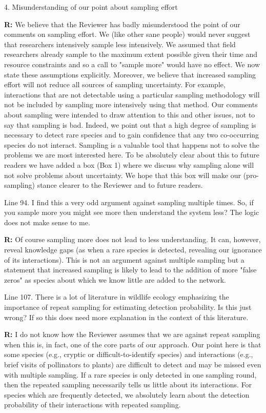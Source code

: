 \documentclass[12pt]{letter}
\begin{document}
4. Misunderstanding of our point about sampling effort



	\textbf{R:} We believe that the Reviewer has badly misunderstood the point of our comments on sampling effort. We (like other sane people) would never suggest that researchers intensively sample less intensively. We assumed that field researchers already sample to the maximum extent possible given their time and resource constraints and so a call to "sample more" would have no effect. We now state these assumptions explicitly. Moreover, we believe that increased sampling effort will not reduce all sources of sampling uncertainty. For example, interactions that are not detectable using a particular sampling methodology will not be included by sampling more intensively using that method. Our comments about sampling were intended to draw attention to this and other issues, not to say that sampling is bad. Indeed, we point out that a high degree of sampling is necessary to detect rare species and to gain confidence that any two co-occurring species do not interact. Sampling is a valuable tool that happens not to solve the problems we are most interested here. To be absolutely clear about this to future readers we have added a box (Box 1) where we discuss why sampling alone will not solve problems about uncertainty. We hope that this box will make our (pro-sampling) stance clearer to the Reviewer and to future readers.



	Line 94.  I find this a very odd argument against sampling multiple times.  So, if you sample more you might see more then understand the system less?  The logic does not make sense to me. 

	\textbf{R:} Of course sampling more does not lead to less understanding. It can, however, reveal knowledge gaps (as when a rare species is detected, revealing our ignorance of its interactions). This is not an argument against multiple sampling but a statement that increased sampling is likely to lead to the addition of more "false zeros" as species about which we know little are added to the network.

	Line 107.  There is a lot of literature in wildlife ecology emphasizing the importance of repeat sampling for estimating detection probability.  Is this just wrong?  If so this does need more explanation in the context of this literature.

	\textbf{R:} I do not know how the Reviewer assumes that we are against repeat sampling when this is, in fact, one of the core parts of our approach. Our point here is that some species (e.g., cryptic or difficult-to-identify species) and interactions (e.g., brief visits of pollinators to plants) are difficult to detect and may be missed even with multiple sampling. If a rare species is only detected in one sampling round, then the repeated sampling necessarily tells us little about its interactions. For species which are frequently detected, we absolutely learn about the detection probability of their interactions with repeated sampling.
\end{document}
